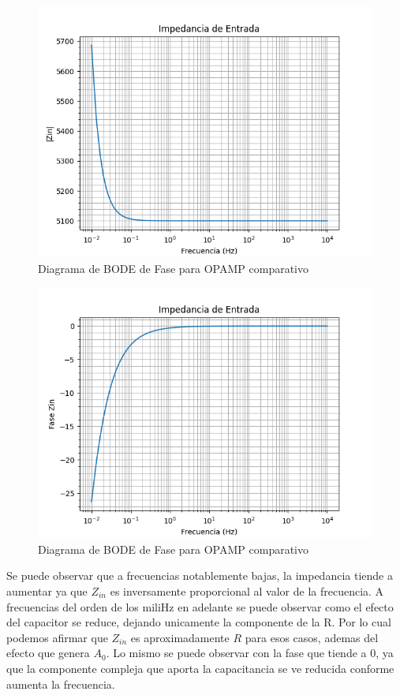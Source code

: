 \begin{figure}[H]
    \centering 
    \includegraphics [scale=1] {../Ejercicio3-CircuitoIntegradoresyDerivadores/Imagenes/zin-magnitud.png} 
    \caption{Diagrama de BODE de Fase para OPAMP comparativo }
    \label{fig:emptyPlotTool}
\end{figure}

\begin{figure}[H]
    \centering 
    \includegraphics [scale=1] {../Ejercicio3-CircuitoIntegradoresyDerivadores/Imagenes/zin-fase.png} 
    \caption{Diagrama de BODE de Fase para OPAMP comparativo }
    \label{fig:emptyPlotTool}
\end{figure}

Se puede observar que a frecuencias notablemente bajas, la impedancia tiende a aumentar ya que $Z_{in}$ es inversamente proporcional al valor de la frecuencia.
A frecuencias del orden de los miliHz en adelante se puede observar como el efecto del capacitor se reduce, dejando unicamente la componente de la R. Por lo cual 
podemos afirmar que $Z_{in}$ es aproximadamente $R$ para esos casos, ademas del efecto que genera $A_0$.
Lo mismo se puede observar con la fase que tiende a 0, ya que la componente compleja que aporta la capacitancia se ve reducida conforme aumenta la frecuencia.